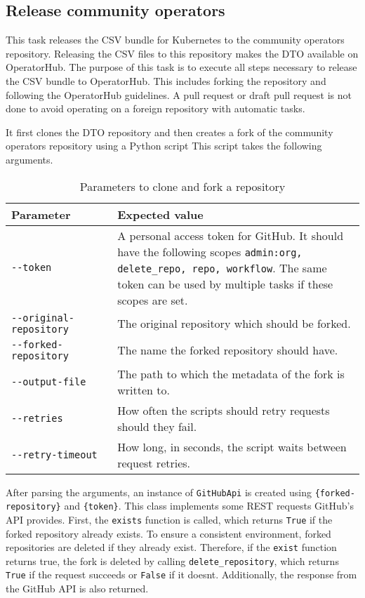 \subsection{Release community operators}\label{subsec:release-community-operators}

This task releases the CSV bundle for Kubernetes to the community operators repository.
Releasing the CSV files to this repository makes the DTO available on OperatorHub.
The purpose of this task is to execute all steps necessary to release the CSV bundle to OperatorHub.
This includes forking the repository and following the OperatorHub guidelines.
A pull request or draft pull request is not done to avoid operating on a foreign repository with automatic tasks.

It first clones the DTO repository and then creates a fork of the community operators repository using a Python script
This script takes the following arguments.

\begin{table}
    \centering
    \caption{Parameters to clone and fork a repository}
    \label{tab:parameters-to-clone-and-fork-a-repository}
    \begin{tabular}{|p{0.3\linewidth}|p{0.7\linewidth}|}
        Parameter & Expected value \\
        \hline
        \verb|--token| & A personal access token for GitHub.
            It should have the following scopes \verb|admin:org, delete_repo, repo, workflow|.
            The same token can be used by multiple tasks if these scopes are set. \\
        \verb|--original-repository| & The original repository which should be forked. \\
        \verb|--forked-repository| & The name the forked repository should have. \\
        \verb|--output-file| & The path to which the metadata of the fork is written to. \\
        \verb|--retries| & How often the scripts should retry requests should they fail. \\
        \verb|--retry-timeout| & How long, in seconds, the script waits between request retries. \\
    \end{tabular}
\end{table}

After parsing the arguments, an instance of \verb|GitHubApi| is created using \verb|{forked-repository}| and \verb|{token}|.
This class implements some REST requests GitHub's API provides.
First, the \verb|exists| function is called, which returns \verb|True| if the forked repository already exists.
To ensure a consistent environment, forked repositories are deleted if they already exist.
Therefore, if the \verb|exist| function returns true, the fork is deleted by calling \verb|delete_repository|, which returns \verb|True| if the request succeeds or \verb|False| if it doesnt.
Additionally, the response from the GitHub API is also returned.

